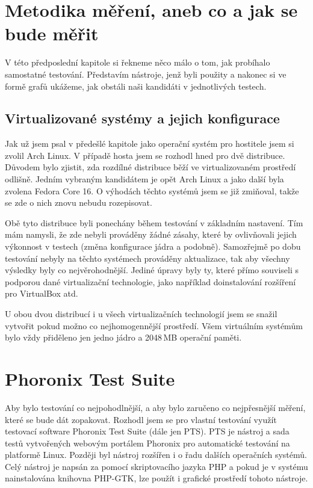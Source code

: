 \section{Metodika měření, aneb co a jak se bude měřit}
V této předposlední kapitole si řekneme něco málo o tom, jak probíhalo samostatné testování. Představím nástroje, jenž byli použity a nakonec si ve formě grafů ukážeme, jak obstáli naši kandidáti v jednotlivých testech.
\subsection{Virtualizované systémy a jejich konfigurace}
Jak už jsem psal v předešlé kapitole jako operační systém pro hostitele jsem si zvolil Arch Linux. V případě hosta jsem se rozhodl hned pro dvě distribuce. Důvodem bylo zjistit, zda rozdílné distribuce běží ve virtualizovaném prostředí odlišně. Jedním vybraným kandidátem je opět Arch Linux a jako další byla zvolena Fedora Core 16. O výhodách těchto systémů jsem se již zmiňoval, takže se zde o nich znovu nebudu rozepisovat.

Obě tyto distribuce byli ponechány během testování v základním nastavení. Tím mám namysli, že zde nebyli prováděny žádné zásahy, které by ovlivňovali jejich výkonnost v testech (změna konfigurace jádra a podobně). Samozřejmě po dobu testování nebyly na těchto systémech prováděny aktualizace, tak aby všechny výsledky byly co nejvěrohodnější. Jediné úpravy byly ty, které přímo souviseli s podporou dané virtualizační technologie, jako například doinstalování rozšíření pro VirtualBox atd.

U obou dvou distribucí i u všech virtualizačních technologií jsem se snažil vytvořit pokud možno co nejhomogennější prostředí. Všem virtuálním systémům bylo vždy přiděleno jen jedno jádro a 2048\,MB operační paměti.

\section{Phoronix Test Suite}
Aby bylo testování co nejpohodlnější, a aby bylo zaručeno co nejpřesnější měření, které se bude dát zopakovat. Rozhodl jsem se pro vlastní testování využít testovací software Phoronix Test Suite (dále jen PTS). PTS je nástroj a sada testů vytvořených webovým portálem Phoronix pro automatické testování na platformě Linux. Později byl nástroj rozšířen i o řadu dalších operačních systémů. Celý nástroj je napsán za pomocí skriptovacího jazyka PHP a pokud je v systému nainstalována knihovna PHP-GTK, lze použít i grafické prostředí tohoto nástroje.

